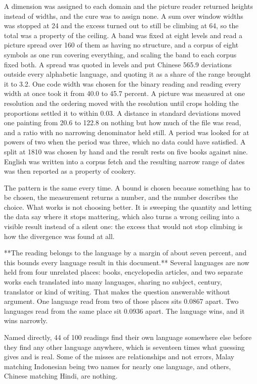 A dimension was assigned to each domain and the picture reader returned heights instead of widths, and the cure was to assign none. A sum over window widths was stopped at 24 and the excess turned out to still be climbing at 64, so the total was a property of the ceiling. A band was fixed at eight levels and read a picture spread over 160 of them as having no structure, and a corpus of eight symbols as one run covering everything, and scaling the band to each corpus fixed both. A spread was quoted in levels and put Chinese 565.9 deviations outside every alphabetic language, and quoting it as a share of the range brought it to 3.2. One code width was chosen for the binary reading and reading every width at once took it from 40.0 to 45.7 percent. A picture was measured at one resolution and the ordering moved with the resolution until crops holding the proportions settled it to within 0.03. A distance in standard deviations moved one painting from 20.6 to 122.8 on nothing but how much of the file was read, and a ratio with no narrowing denominator held still. A period was looked for at powers of two when the period was three, which no data could have satisfied. A split at 1810 was chosen by hand and the result rests on five books against nine. English was written into a corpus fetch and the resulting narrow range of dates was then reported as a property of cookery.

The pattern is the same every time. A bound is chosen because something has to be chosen, the measurement returns a number, and the number describes the choice. What works is not choosing better. It is sweeping the quantity and letting the data say where it stops mattering, which also turns a wrong ceiling into a visible result instead of a silent one: the excess that would not stop climbing is how the divergence was found at all.

**The reading belongs to the language by a margin of about seven percent, and this bounds every language result in this document.** Several languages are now held from four unrelated places: books, encyclopedia articles, and two separate works each translated into many languages, sharing no subject, century, translator or kind of writing. That makes the question answerable without argument. One language read from two of those places sits 0.0867 apart. Two languages read from the same place sit 0.0936 apart. The language wins, and it wins narrowly.

Named directly, 44 of 100 readings find their own language somewhere else before they find any other language anywhere, which is seventeen times what guessing gives and is real. Some of the misses are relationships and not errors, Malay matching Indonesian being two names for nearly one language, and others, Chinese matching Hindi, are nothing.

